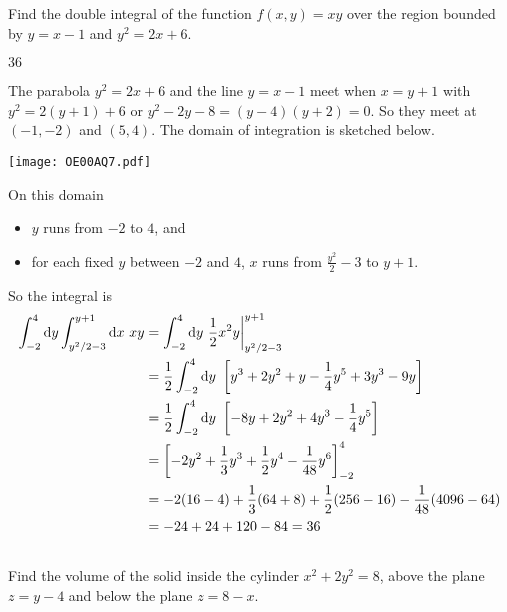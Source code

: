 \begin{question}[M200 2000A] %
Find the double integral of the function $f(x, y) = xy$
 over the region bounded by $y = x - 1$ and $y^2 = 2x + 6$.
\end{question}

%

\begin{answer}
$36$
\end{answer}

\begin{solution}
The parabola $y^2=2x+6$ and the line $y=x-1$ meet when $x=y+1$
with $y^2=2(y+1)+6$ or $y^2-2y-8=(y-4)(y+2)=0$. So they meet at $(-1,-2)$ and $(5,4)$.
The domain of integration is sketched below. 
\begin{center}
     \texttt{[image: OE00AQ7.pdf]}
\end{center}
On this domain
\begin{itemize}
\item
$y$ runs from $-2$ to $4$, and
\item
for each fixed $y$ between $-2$ and $4$, $x$ runs from $\frac{y^2}{2}-3$
to $y+1$.
\end{itemize}
So the integral is 
\begin{align*}
\int_{-2}^4\dee{y}\int_{y^2/2-3}^{y+1}\dee{x}\ xy
&=\int_{-2}^4\dee{y}\ \frac{1}{2} x^2y\bigg|_{y^2/2-3}^{y+1} \\
&=\frac{1}{2}\int_{-2}^4\dee{y}\ 
                  \left[y^3+2y^2+y-\frac{1}{4}y^5+3y^3-9y\right] \\
&=\frac{1}{2}\int_{-2}^4\dee{y}\ \left[-8y+2y^2+4y^3-\frac{1}{4}y^5\right] \\
&=\left[-2y^2+\frac{1}{3}y^3+\frac{1}{2}y^4-\frac{1}{48}y^6\right]_{-2}^4 \\
&=-2(16-4)+\frac{1}{3}(64+8)+\frac{1}{2}(256-16)
-\frac{1}{48}(4096-64)\cr
&=-24+24+120-84=36
\end{align*}
\end{solution}



\subsection*{\Application}

\begin{question}
Find the volume of the solid inside the cylinder $x^2+2y^2=8$, above
the plane $z=y-4$ and below the plane $z=8-x$.
\end{question}

